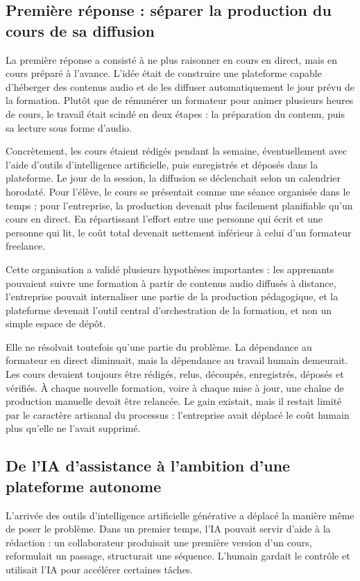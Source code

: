 \documentclass[12pt,a4paper]{article}
\begin{document}
\subsection{Première réponse : séparer la production du cours de sa diffusion}

La première réponse a consisté à ne plus raisonner en cours en direct, mais en cours
préparé à l'avance. L'idée était de construire une plateforme capable d'héberger des
contenus audio et de les diffuser automatiquement le jour prévu de la formation. Plutôt
que de rémunérer un formateur pour animer plusieurs heures de cours, le travail était
scindé en deux étapes : la préparation du contenu, puis sa lecture sous forme d'audio.

Concrètement, les cours étaient rédigés pendant la semaine, éventuellement avec l'aide
d'outils d'intelligence artificielle, puis enregistrés et déposés dans la plateforme. Le jour
de la session, la diffusion se déclenchait selon un calendrier horodaté. Pour l'élève, le
cours se présentait comme une séance organisée dans le temps ; pour l'entreprise, la
production devenait plus facilement planifiable qu'un cours en direct. En répartissant
l'effort entre une personne qui écrit et une personne qui lit, le coût total devenait
nettement inférieur à celui d'un formateur freelance.

Cette organisation a validé plusieurs hypothèses importantes : les apprenants pouvaient
suivre une formation à partir de contenus audio diffusés à distance, l'entreprise pouvait
internaliser une partie de la production pédagogique, et la plateforme devenait l'outil
central d'orchestration de la formation, et non un simple espace de dépôt.

Elle ne résolvait toutefois qu'une partie du problème. La dépendance au formateur en
direct diminuait, mais la dépendance au travail humain demeurait. Les cours devaient
toujours être rédigés, relus, découpés, enregistrés, déposés et vérifiés. À chaque nouvelle
formation, voire à chaque mise à jour, une chaîne de production manuelle devait être
relancée. Le gain existait, mais il restait limité par le caractère artisanal du processus :
l'entreprise avait déplacé le coût humain plus qu'elle ne l'avait supprimé.

\subsection{De l'IA d'assistance à l'ambition d'une plateforme autonome}

L'arrivée des outils d'intelligence artificielle générative a déplacé la manière même de
poser le problème. Dans un premier temps, l'IA pouvait servir d'aide à la rédaction : un
collaborateur produisait une première version d'un cours, reformulait un passage,
structurait une séquence. L'humain gardait le contrôle et utilisait l'IA pour accélérer
certaines tâches.
\end{document}
